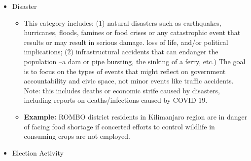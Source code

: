 \documentclass[
  letterpaper,
  DIV=11,
  numbers=noendperiod]{scrartcl}
\providecommand{\tightlist}{%
  \setlength{\itemsep}{0pt}\setlength{\parskip}{0pt}}\usepackage{longtable,booktabs,array}
\begin{document}
\begin{itemize}
  \begin{itemize}
  \tightlist
  \item
    Cases in which an individual or a group related to an opposition
    movement or party, current or former government officials, a civil
    society organization, a media organization, a business leader, a
    member of a minority group, or a protest are accused, usually by a
    government official, of: directly defaming/libeling/slandering the
    government or one or some of its members. Alternatively, these are:
    strategic lawsuits against civic actors to intimidate public
    participation. This category is a subset of the `Legal Action' event
    type (see below).
  \item
    \textbf{Example:} ``A Phnom Penh court on Friday found veteran
    opposition chief Sam Rainsy guilty of defaming Prime Minister Hun
    Sen and ordered him to pay damages of \$1 million, the latest blow
    to an opposition crippled by legal cases this year.''
  \end{itemize}
\item
  Disaster

  \begin{itemize}
  \tightlist
  \item
    This category includes: (1) natural disasters such as earthquakes,
    hurricanes, floods, famines or food crises or any catastrophic event
    that results or may result in serious damage. loss of life, and/or
    political implications; (2) infrastructural accidents that can
    endanger the population --a dam or pipe bursting, the sinking of a
    ferry, etc.) The goal is to focus on the types of events that might
    reflect on government accountability and civic space, not minor
    events like traffic accidents. Note: this includes deaths or
    economic strife caused by disasters, including reports on
    deaths/infections caused by COVID-19.
  \item
    \textbf{Example:} ROMBO district residents in Kilimanjaro region are
    in danger of facing food shortage if concerted efforts to control
    wildlife in consuming crops are not employed.
  \end{itemize}
\item
  Election Activity


\end{itemize}
\end{document}
